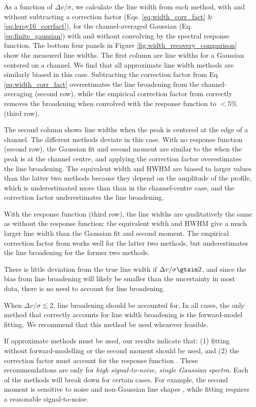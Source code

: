 \documentclass{rnaastex}
\begin{document}
As a function of $\Delta v / \sigma$, we calculate the line width from each method, with and without subtracting a correction factor (Eqs. \ref{eq:width_corr_fact} \& \ref{eq:leroy16_corrfact}), for the channel-averaged Gaussian (Eq. \ref{eq:finite_gaussian}) with and without convolving by the spectral response function.  The bottom four panels in Figure \ref{fig:width_recovery_comparison} show the measured line widths.  The first column are line widths for a Gaussian centered on a channel.  We find that all approximate line width methods are similarly biased in this case.  Subtracting the correction factor from Eq. \ref{eq:width_corr_fact} overestimates the line broadening from the channel-averaging (second row), while the empirical correction factor from \citet{leroy2016} correctly removes the broadening when convolved with the response function to $<5\%$ (third row).

The second column shows line widths when the peak is centered at the edge of a channel. The different methods deviate in this case.  With no response function (second row), the Gaussian fit and second moment are similar to the when the peak is at the channel centre, and applying the correction factor overestimates the line broadening. The equivalent width and HWHM are biased to larger values than the latter two methods because they depend on the amplitude of the profile, which is underestimated more than than in the channel-centre case, and the correction factor {\ti underestimates} the line broadening.

With the response function (third row), the line widths are qualitatively the same as without the response function: the equivalent width and HWHM give a much larger line width than the Gaussian fit and second moment.  The empirical correction factor from \citet{leroy2016} works well for the latter two methods, but underestimates the line broadening for the former two methods.

There is little deviation from the true line width if $\Delta v / \sigma \gtsim 2$, and since the bias from line broadening will likely be smaller than the uncertainty in most data, there is no need to account for line broadening. 

When $\Delta v / \sigma \lesssim 2$, line broadening should be accounted for.  In all cases, the only method that correctly accounts for line width broadening is the forward-model fitting.  We recommend that this method be used whenever feasible.

If approximate methods must be used, our results indicate that: (1) fitting without forward-modelling or the second moment should be used, and (2) the correction factor must account for the response function \citep[Eq. \ref{eq:leroy16_corrfact}][]{leroy2016}.  These recommendations are only for {\it high signal-to-noise, single Gaussian spectra}.  Each of the methods will break down for certain cases. For example, the second moment is sensitive to noise and non-Gaussian line shapes \citep{koch2018}, while fitting requires a reasonable signal-to-noise. 
\end{document}

